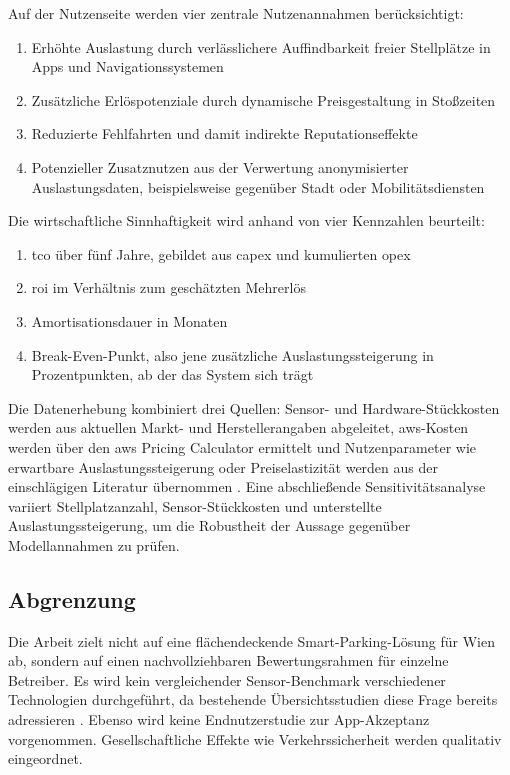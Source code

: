 Auf der Nutzenseite werden vier zentrale Nutzenannahmen berücksichtigt:
\begin{enumerate}
    \item Erhöhte Auslastung durch verlässlichere Auffindbarkeit freier Stellplätze in Apps und Navigationssystemen \citep{alaanzyRealTimeSmart2025}
    \item Zusätzliche Erlöspotenziale durch dynamische Preisgestaltung in Stoßzeiten \citep{hassineDynamicPricingRoute2024,sarkerSmartParkingSystem2020}
    \item Reduzierte Fehlfahrten und damit indirekte Reputationseffekte
    \item Potenzieller Zusatznutzen aus der Verwertung anonymisierter Auslastungsdaten, beispielsweise gegenüber Stadt oder Mobilitätsdiensten \citep{wangEconomicsSmartParking2025}
\end{enumerate}

Die wirtschaftliche Sinnhaftigkeit wird anhand von vier Kennzahlen beurteilt:
\begin{enumerate}
    \item \ac{tco} über fünf Jahre, gebildet aus \ac{capex} und kumulierten \ac{opex}
    \item \ac{roi} im Verhältnis zum geschätzten Mehrerlös
    \item Amortisationsdauer in Monaten
    \item Break-Even-Punkt, also jene zusätzliche Auslastungssteigerung in Prozentpunkten, ab der das System sich trägt
\end{enumerate}

Die Datenerhebung kombiniert drei Quellen: Sensor- und Hardware-Stückkosten werden aus aktuellen Markt- und Herstellerangaben abgeleitet, \ac{aws}-Kosten werden über den \ac{aws} Pricing Calculator ermittelt und Nutzenparameter wie erwartbare Auslastungssteigerung oder Preiselastizität werden aus der einschlägigen Literatur übernommen \citep{wangEconomicsSmartParking2025,sarkerSmartParkingSystem2020}. Eine abschließende Sensitivitätsanalyse variiert Stellplatzanzahl, Sensor-Stückkosten und unterstellte Auslastungssteigerung, um die Robustheit der Aussage gegenüber Modellannahmen zu prüfen.

\subsection{Abgrenzung}

Die Arbeit zielt nicht auf eine flächendeckende Smart-Parking-Lösung für Wien ab, sondern auf einen nachvollziehbaren Bewertungsrahmen für einzelne Betreiber. Es wird kein vergleichender Sensor-Benchmark verschiedener Technologien durchgeführt, da bestehende Übersichtsstudien diese Frage bereits adressieren \citep{perkovicSmartParkingSensors2020,fahimSmartParkingSystems2021}. Ebenso wird keine Endnutzerstudie zur App-Akzeptanz vorgenommen. Gesellschaftliche Effekte wie Verkehrssicherheit werden qualitativ eingeordnet.

